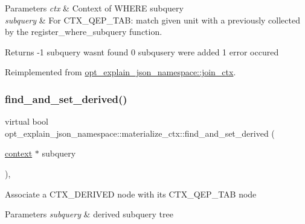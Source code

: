 \begin{DoxyParams}{Parameters}
{\em ctx} & Context of W\+H\+E\+RE subquery \\
\hline
{\em subquery} & For C\+T\+X\+\_\+\+Q\+E\+P\+\_\+\+T\+AB\+: match given unit with a previously collected by the register\+\_\+where\+\_\+subquery function. \\
\hline
\end{DoxyParams}
\begin{DoxyReturn}{Returns}
-\/1 subquery wasn\textquotesingle{}t found 0 subqusery were added 1 error occured 
\end{DoxyReturn}


Reimplemented from \mbox{\hyperlink{classopt__explain__json__namespace_1_1join__ctx_a6d8ebc9b02d479b1b93d2a55b1e1f5ef}{opt\+\_\+explain\+\_\+json\+\_\+namespace\+::join\+\_\+ctx}}.

\mbox{\label{classopt__explain__json__namespace_1_1materialize__ctx_a907eb60c00dc90af2832012bfed3bb1e}} 
\subsubsection{\texorpdfstring{find\+\_\+and\+\_\+set\+\_\+derived()}{find\_and\_set\_derived()}}
{\footnotesize\ttfamily virtual bool opt\+\_\+explain\+\_\+json\+\_\+namespace\+::materialize\+\_\+ctx\+::find\+\_\+and\+\_\+set\+\_\+derived (\begin{DoxyParamCaption}\item[{\mbox{\hyperlink{classopt__explain__json__namespace_1_1context}{context}} $\ast$}]{subquery }\end{DoxyParamCaption})\hspace{0.3cm}{\ttfamily [inline]}, {\ttfamily [virtual]}}

Associate a C\+T\+X\+\_\+\+D\+E\+R\+I\+V\+ED node with its C\+T\+X\+\_\+\+Q\+E\+P\+\_\+\+T\+AB node


\begin{DoxyParams}{Parameters}
{\em subquery} & derived subquery tree \\
\hline
\end{DoxyParams}


